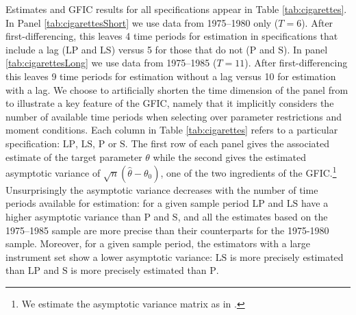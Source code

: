 Estimates and GFIC results for all specifications appear in Table \ref{tab:cigarettes}.
In Panel \ref{tab:cigarettesShort} we use data from 1975--1980 only ($T=6$).
After first-differencing, this leaves 4 time periods for estimation in specifications that include a lag ($\text{LP}$ and $\text{LS}$) versus 5 for those that do not ($\text{P}$ and $\text{S}$).
In panel \ref{tab:cigarettesLong} we use data from 1975--1985 ($T=11$).
After first-differencing this leaves 9 time periods for estimation without a lag versus 10 for estimation with a lag.
We choose to artificially shorten the time dimension of the panel from \cite{BaltagiEtAl2000} to illustrate a key feature of the GFIC, namely that it implicitly considers the number of available time periods when selecting over parameter restrictions and moment conditions. 
Each column in Table \ref{tab:cigarettes} refers to a particular specification: $\text{LP}$, $\text{LS}$, $\text{P}$ or $\text{S}$.
The first row of each panel gives the associated estimate of the target parameter $\theta$ while the second gives the estimated asymptotic variance of $\sqrt{n}(\widehat{\theta} - \theta_0)$, one of the two ingredients of the GFIC.\footnote{We estimate the asymptotic variance matrix as in \cite{BaltagiEtAl2000}.}
Unsurprisingly the asymptotic variance decreases with the number of time periods available for estimation: for a given sample period $\text{LP}$ and $\text{LS}$ have a higher asymptotic variance than $\text{P}$ and $\text{S}$, and all the estimates based on the 1975--1985 sample are more precise than their counterparts for the 1975-1980 sample.
Moreover, for a given sample period, the estimators with a large instrument set show a lower asymptotic variance: $\text{LS}$ is more precisely estimated than $\text{LP}$ and $\text{S}$ is more precisely estimated than $\text{P}$.

